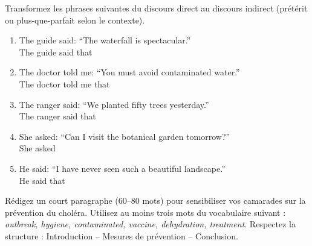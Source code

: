 \documentclass[11pt]{article}
\begin{document}
\begin{exercice}
Transformez les phrases suivantes du discours direct au discours indirect (prétérit ou plus-que-parfait selon le contexte).
\begin{enumerate}
    \item The guide said: ``The waterfall is spectacular.'' \\
    The guide said that \dotfill
    \item The doctor told me: ``You must avoid contaminated water.'' \\
    The doctor told me that \dotfill
    \item The ranger said: ``We planted fifty trees yesterday.'' \\
    The ranger said that \dotfill
    \item She asked: ``Can I visit the botanical garden tomorrow?'' \\
    She asked \dotfill
    \item He said: ``I have never seen such a beautiful landscape.'' \\
    He said that \dotfill
\end{enumerate}
\end{exercice}

\begin{exercice}
Rédigez un court paragraphe (60--80 mots) pour sensibiliser vos camarades sur la prévention du choléra. Utilisez au moins trois mots du vocabulaire suivant : \textit{outbreak, hygiene, contaminated, vaccine, dehydration, treatment}. Respectez la structure : Introduction -- Mesures de prévention -- Conclusion.
\end{exercice}
\end{document}
